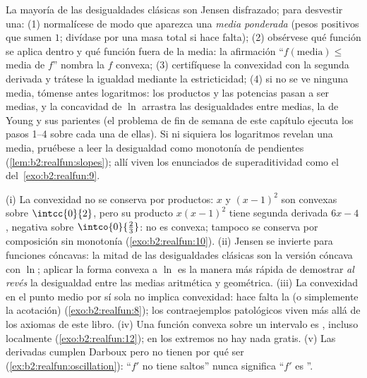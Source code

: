 \begin{method}\label{met:b2:realfun:spotting}
La mayoría de las desigualdades clásicas son Jensen disfrazado; para
desvestir una: (1) normalícese de modo que aparezca una \emph{media
ponderada} (pesos positivos que sumen $1$; divídase por una masa
total si hace falta); (2) obsérvese qué función se aplica dentro y
qué función fuera de la media: la afirmación
``$f(\text{media}) \leq$ media de $f$'' nombra la $f$ convexa; (3)
certifíquese la convexidad con la segunda derivada y trátese la
igualdad mediante la estricticidad; (4) si no se ve ninguna media,
tómense antes logaritmos: los productos y las potencias pasan a ser
medias, y la concavidad de $\ln$ arrastra las desigualdades entre
medias, la de Young y sus parientes (el problema de fin de semana de
este capítulo ejecuta los pasos 1--4 sobre cada una de ellas). Si ni
siquiera los logaritmos revelan una media, pruébese a leer la
desigualdad como monotonía de pendientes
(\cref{lem:b2:realfun:slopes}); allí viven los enunciados de
superaditividad como el del~\cref{exo:b2:realfun:9}.
\end{method}

\begin{remark}\label{rem:b2:realfun:pitfalls}
(i) La convexidad no se conserva por productos: $x$ y $(x - 1)^2$
son convexas sobre $\intcc{0}{2}$, pero su producto $x(x-1)^2$ tiene
segunda derivada $6x - 4$, negativa sobre $\intco{0}{\frac23}$: no
es convexa; tampoco se conserva por composición sin monotonía
(\cref{exo:b2:realfun:10}). (ii) Jensen se invierte para funciones
cóncavas: la mitad de las desigualdades clásicas son la versión
cóncava con $\ln$; aplicar la forma convexa a $\ln$ es la manera más
rápida de demostrar \emph{al revés} la desigualdad entre las medias
aritmética y geométrica. (iii) La convexidad en el punto medio por
sí sola no implica convexidad: hace falta la  (o
simplemente la acotación) (\cref{exo:b2:realfun:8}); los
contraejemplos patológicos viven más allá de los axiomas de este
libro. (iv) Una función convexa sobre un intervalo \emph{}
es , incluso localmente 
(\cref{exo:b2:realfun:12}); en los extremos no hay nada gratis. (v)
Las derivadas cumplen Darboux pero no tienen por qué ser 
(\cref{ex:b2:realfun:oscillation}): ``$f'$ no tiene saltos'' nunca
significa ``$f'$ es ''.
\end{remark}

